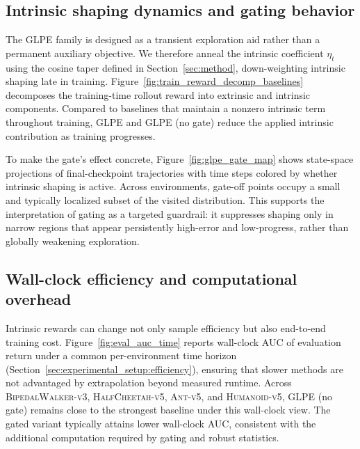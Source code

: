 \subsection{Intrinsic shaping dynamics and gating behavior}

The GLPE family is designed as a transient exploration aid rather than a permanent auxiliary objective.
We therefore anneal the intrinsic coefficient $\eta_t$ using the cosine taper defined in Section~\ref{sec:method}, down-weighting intrinsic shaping late in training.
Figure~\ref{fig:train_reward_decomp_baselines} decomposes the training-time rollout reward into extrinsic and intrinsic components.
Compared to baselines that maintain a nonzero intrinsic term throughout training, GLPE and GLPE (no gate) reduce the applied intrinsic contribution as training progresses.



To make the gate's effect concrete, Figure~\ref{fig:glpe_gate_map} shows state-space projections of final-checkpoint trajectories with time steps colored by whether intrinsic shaping is active.
Across environments, gate-off points occupy a small and typically localized subset of the visited distribution.
This supports the interpretation of gating as a targeted guardrail: it suppresses shaping only in narrow regions that appear persistently high-error and low-progress, rather than globally weakening exploration.



\subsection{Wall-clock efficiency and computational overhead}

Intrinsic rewards can change not only sample efficiency but also end-to-end training cost.
Figure~\ref{fig:eval_auc_time} reports wall-clock AUC of evaluation return under a common per-environment time horizon (Section~\ref{sec:experimental_setup:efficiency}), ensuring that slower methods are not advantaged by extrapolation beyond measured runtime.
Across \textsc{BipedalWalker-v3}, \textsc{HalfCheetah-v5}, \textsc{Ant-v5}, and \textsc{Humanoid-v5}, GLPE (no gate) remains close to the strongest baseline under this wall-clock view.
The gated variant typically attains lower wall-clock AUC, consistent with the additional computation required by gating and robust statistics.



